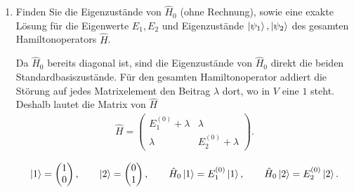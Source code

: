 \documentclass[11pt,a4paper]{scrartcl}
\newcommand{\op}[1]{\hat{#1}}
\begin{document}
    \begin{enumerate}[label=(\alph*)]
        \item Finden Sie die Eigenzustände von $\op H_0$ (ohne Rechnung), sowie eine exakte Lösung für die Eigenwerte $E_1,E_2$ und Eigenzustände $\ket{\psi_1},\ket{\psi_2}$ des gesamten Hamiltonoperators $\op H$.

        \begin{calculationbox}
            Da $\op H_0$ bereits diagonal ist, sind die Eigenzustände von $\op H_0$ direkt die beiden Standardbasiszustände. Für den gesamten Hamiltonoperator addiert die Störung auf jedes Matrixelement den Beitrag $\lambda$ dort, wo in $V$ eine $1$ steht. Deshalb lautet die Matrix von $\op H$
            \begin{align*}
                \op H
                =
                \begin{pmatrix}
                    E_1^{(0)}+\lambda & \lambda\\
                    \lambda & E_2^{(0)}+\lambda
                \end{pmatrix}.
            \end{align*}

            \begin{solutionbox}[title=Ungestörte Eigenzustände]
                \begin{align*}
                    \ket{1}=\begin{pmatrix}1\\0\end{pmatrix},
                    \qquad
                    \ket{2}=\begin{pmatrix}0\\1\end{pmatrix},
                    \qquad
                    \op H_0\ket{1}=E_1^{(0)}\ket{1},
                    \qquad
                    \op H_0\ket{2}=E_2^{(0)}\ket{2}.
                \end{align*}
            \end{solutionbox}


\end{calculationbox}
\end{enumerate}
\end{document}

